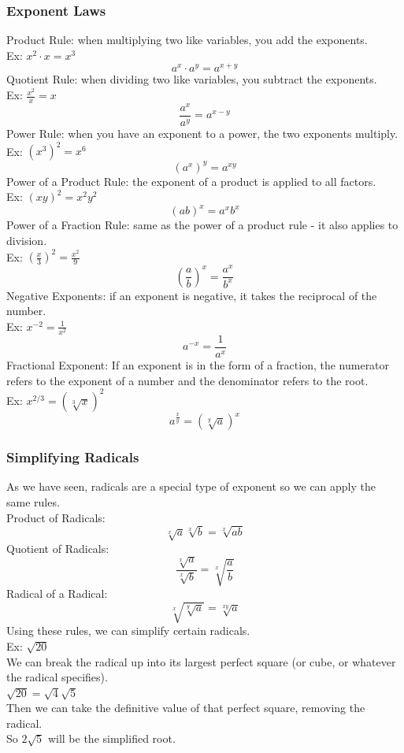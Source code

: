 \documentclass[11pt, fleqn]{article}
\begin{document}
\subsubsection{Exponent Laws}
Product Rule: when multiplying two like variables, you add the exponents.\\ Ex: $x^2\cdot x=x^3$
$$a^x\cdot a^y=a^{x+y}$$
Quotient Rule: when dividing two like variables, you subtract the exponents.\\
Ex: $\frac{x^2}{x}=x$
$$\frac{a^x}{a^y}=a^{x-y}$$
Power Rule: when you have an exponent to a power, the two exponents multiply.\\
Ex: $(x^3)^2=x^6$
$$(a^x)^y=a^{xy}$$
Power of a Product Rule: the exponent of a product is applied to all factors.\\
Ex: $(xy)^2=x^2y^2$
$$(ab)^x=a^xb^x$$
Power of a Fraction Rule: same as the power of a product rule - it also applies to division.\\
Ex: $\left(\frac{x}{3}\right)^2=\frac{x^2}{9}$
$$\left(\frac{a}{b}\right)^x=\frac{a^x}{b^x}$$
Negative Exponents: if an exponent is negative, it takes the reciprocal of the number.\\
Ex: $x^{-2}=\frac{1}{x^2}$
$$a^{-x}=\frac{1}{a^x}$$
Fractional Exponent: If an exponent is in the form of a fraction, the numerator refers to the exponent of a number and the denominator refers to the root.\\
Ex: $x^{2/3}=(\sqrt[3]{x})^2$
$$a^{\frac{x}{y}}=\left(\sqrt[y]{a}\right)^x$$

\subsubsection{Simplifying Radicals}
As we have seen, radicals are a special type of exponent so we can apply the same rules.\\
Product of Radicals:
$$\sqrt[x]{a}\sqrt[x]{b}=\sqrt[x]{ab}$$
Quotient of Radicals:
$$\frac{\sqrt[x]{a}}{\sqrt[x]{b}}=\sqrt[x]{\frac{a}{b}}$$
Radical of a Radical:
$$\sqrt[x]{\sqrt[y]{a}}=\sqrt[xy]{a}$$
Using these rules, we can simplify certain radicals.\\
Ex: $\sqrt{20}$\\
We can break the radical up into its largest perfect square (or cube, or whatever the radical specifies).\\
$\sqrt{20}=\sqrt{4}\sqrt{5}$\\
Then we can take the definitive value of that perfect square, removing the radical.\\
So $2\sqrt{5}$ will be the simplified root.
\end{document}
